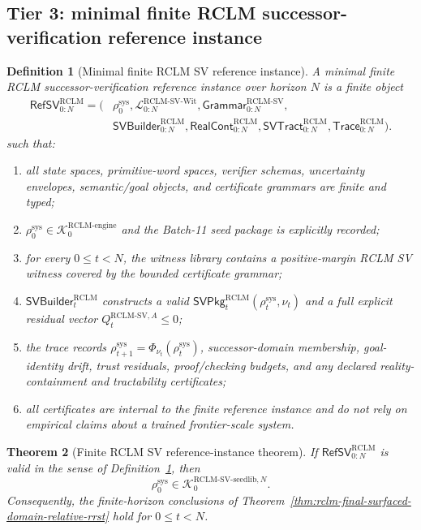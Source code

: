 \documentclass[11pt,a4paper]{article}
\newtheorem{theorem}{Theorem}[section]
\newtheorem{definition}[theorem]{Definition}
\newcommand{\Lcal}{\mathcal L}
\newcommand{\Kcal}{\mathcal K}
\newcommand{\RCLM}{\mathrm{RCLM}}
\newcommand{\sys}{\mathrm{sys}}
\newcommand{\engine}{\mathrm{engine}}
\begin{document}
\subsection{Tier 3: minimal finite RCLM successor-verification reference instance}

\begin{definition}[Minimal finite RCLM SV reference instance]
\label{def:minimal-finite-rclm-sv-reference-instance}
A minimal finite RCLM successor-verification reference instance over horizon \(N\) is a finite object
\[
\begin{aligned}
\mathsf{RefSV}_{0:N}^{\RCLM}
=(&\rho_0^{\sys},
\Lcal_{0:N}^{\RCLM\text{-}\mathrm{SV\mbox{-}Wit}},
\mathsf{Grammar}_{0:N}^{\RCLM\text{-}\mathrm{SV}},\\
&\mathsf{SVBuilder}_{0:N}^{\RCLM},
\mathsf{RealCont}_{0:N}^{\RCLM},
\mathsf{SVTract}_{0:N}^{\RCLM},
\mathsf{Trace}_{0:N}^{\RCLM}).
\end{aligned}
\]
such that:
\begin{enumerate}[label=(\roman*),leftmargin=1.5em]
    \item all state spaces, primitive-word spaces, verifier schemas, uncertainty envelopes, semantic/goal objects, and certificate grammars are finite and typed;
    \item \(\rho_0^{\sys}\in\Kcal_0^{\RCLM\text{-}\engine}\) and the Batch-11 seed package is explicitly recorded;
    \item for every \(0\le t<N\), the witness library contains a positive-margin RCLM SV witness covered by the bounded certificate grammar;
    \item \(\mathsf{SVBuilder}_t^{\RCLM}\) constructs a valid \(\mathsf{SVPkg}_t^{\RCLM}(\rho_t^{\sys},\nu_t)\) and a full explicit residual vector \(Q_t^{\RCLM\text{-}\mathrm{SV},A}\le0\);
    \item the trace records \(\rho_{t+1}^{\sys}=\Phi_{\nu_t}(\rho_t^{\sys})\), successor-domain membership, goal-identity drift, trust residuals, proof/checking budgets, and any declared reality-containment and tractability certificates;
    \item all certificates are internal to the finite reference instance and do not rely on empirical claims about a trained frontier-scale system.
\end{enumerate}
\end{definition}

\begin{theorem}[Finite RCLM SV reference-instance theorem]
\label{thm:finite-rclm-sv-reference-instance}
If \(\mathsf{RefSV}_{0:N}^{\RCLM}\) is valid in the sense of Definition~\ref{def:minimal-finite-rclm-sv-reference-instance}, then
\[
\rho_0^{\sys}
\in
\Kcal_0^{\RCLM\text{-}\mathrm{SV\mbox{-}seedlib},N}.
\]
Consequently, the finite-horizon conclusions of Theorem~\ref{thm:rclm-final-surfaced-domain-relative-rrst} hold for \(0\le t<N\).
\end{theorem}
\end{document}
